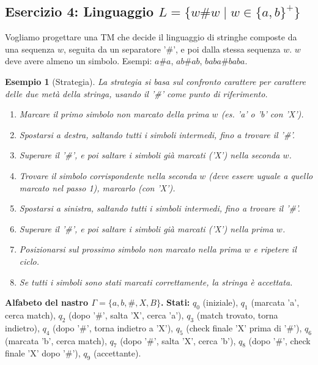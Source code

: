\documentclass[a4paper]{article}
\newtheorem{example}{Esempio}
\begin{document}
\subsection{Esercizio 4: Linguaggio $L = \{w\#w \mid w \in \{a,b\}^+\}$}

Vogliamo progettare una TM che decide il linguaggio di stringhe composte da una sequenza $w$, seguita da un separatore '\#', e poi dalla stessa sequenza $w$. $w$ deve avere almeno un simbolo. Esempi: $a\#a$, $ab\#ab$, $baba\#baba$.

\begin{example}[Strategia]
La strategia si basa sul confronto carattere per carattere delle due metà della stringa, usando il '\#' come punto di riferimento.
\begin{enumerate}
    \item Marcare il primo simbolo non marcato della prima $w$ (es. 'a' o 'b' con 'X').
    \item Spostarsi a destra, saltando tutti i simboli intermedi, fino a trovare il '\#'.
    \item Superare il '\#', e poi saltare i simboli già marcati ('X') nella seconda $w$.
    \item Trovare il simbolo corrispondente nella seconda $w$ (deve essere uguale a quello marcato nel passo 1), marcarlo (con 'X').
    \item Spostarsi a sinistra, saltando tutti i simboli intermedi, fino a trovare il '\#'.
    \item Superare il '\#', e poi saltare i simboli già marcati ('X') nella prima $w$.
    \item Posizionarsi sul prossimo simbolo non marcato nella prima $w$ e ripetere il ciclo.
    \item Se tutti i simboli sono stati marcati correttamente, la stringa è accettata.
\end{enumerate}
\end{example}

\noindent \textbf{Alfabeto del nastro $\Gamma = \{a, b, \#, X, B\}$.}
\noindent \textbf{Stati:} $q_0$ (iniziale), $q_1$ (marcata 'a', cerca match), $q_2$ (dopo '\#', salta 'X', cerca 'a'), $q_3$ (match trovato, torna indietro), $q_4$ (dopo '\#', torna indietro a 'X'), $q_5$ (check finale 'X' prima di '\#'), $q_6$ (marcata 'b', cerca match), $q_7$ (dopo '\#', salta 'X', cerca 'b'), $q_8$ (dopo '\#', check finale 'X' dopo '\#'), $q_9$ (accettante).
\end{document}
